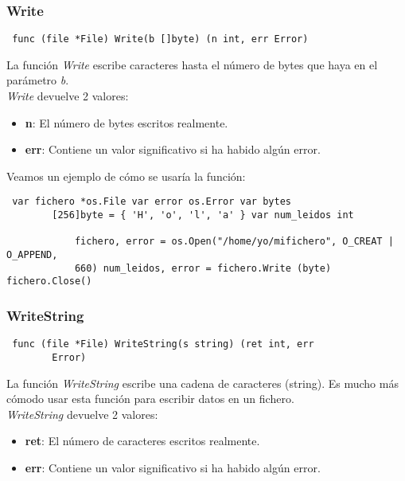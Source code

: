 		\subsubsection{Write}
		
		\begin{verbatim} func (file *File) Write(b []byte) (n int, err Error)
		\end{verbatim}
		
		La función \textit{Write} escribe caracteres hasta el número de bytes
		que haya en el parámetro \textit{b}.\\
		
		\textit{Write} devuelve 2 valores: \begin{itemize} \item \textbf{n}: El
		número de bytes escritos realmente.  \item \textbf{err}: Contiene un
		valor significativo si ha habido algún error.  \end{itemize}
		
		Veamos un ejemplo de cómo se usaría la función:
		
		\begin{verbatim} var fichero *os.File var error os.Error var bytes
		[256]byte = { 'H', 'o', 'l', 'a' } var num_leidos int
		    
			fichero, error = os.Open("/home/yo/mifichero", O_CREAT | O_APPEND,
			660) num_leidos, error = fichero.Write (byte) fichero.Close()
			\end{verbatim}
		
		\subsubsection{WriteString}
		
		\begin{verbatim} func (file *File) WriteString(s string) (ret int, err
		Error) \end{verbatim}
		
		La función \textit{WriteString} escribe una cadena de caracteres
		(string). Es mucho más cómodo usar esta función para escribir datos en
		un fichero.\\
		
		\textit{WriteString} devuelve 2 valores: \begin{itemize} \item
		\textbf{ret}: El número de caracteres escritos realmente.  \item
		\textbf{err}: Contiene un valor significativo si ha habido algún error.
		\end{itemize}
		
